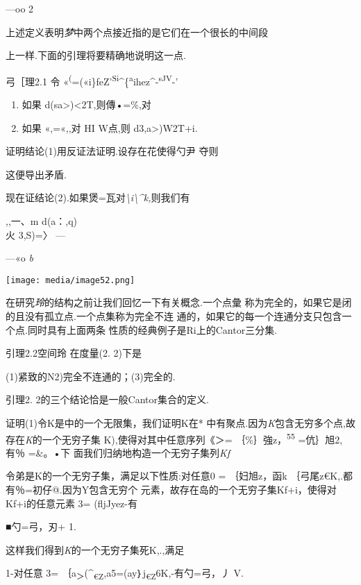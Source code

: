 \documentclass{article}
\begin{document}
---oo 2

上述定义表明\emph{梦}中两个点接近指的是它们在一个很长的中间段

上一样.下面的引理将要精确地说明这一点.

弓［理2.1 令
«\textsuperscript{(}=(«i\}feZ'\textsuperscript{Si}\^{}\{\textsuperscript{a}ihez\^{}-\textsuperscript{sJV}-'

\begin{enumerate}
\def\labelenumi{(\arabic{enumi})}
\item
  如果 d(sa\textgreater{})\textless{}2T,则傳•=\%,对
\item
  如果 «,=«,,对 HI W点,则 d3,a\textgreater{})W2T+i.
\end{enumerate}

证明结论(1)用反证法证明.设存在花使得勺尹 夺则

这便导出矛盾.

现在证结论(2).如果煲=瓦对\emph{\textbackslash{}i\textbackslash{}\^{}k,}则我们有

,,一、m d(a：,q)\\
火 3,S)=〉 ---

---«o \emph{b}

\texttt{[image: media/image52.png]}

在研究\emph{玲}的结构之前让我们回忆一下有关概念.一个点彙
称为完全的，如果它是闭的且没有孤立点.一个点集称为完全不连
通的，如果它的每一个连通分支只包含一个点.同时具有上面两条
性质的经典例子是Ri上的Cantor三分集.

引理2.2空间玲 在度量(2. 2)下是

(1)紧致的N2)完全不连通的；(3)完全的.

引理2. 2的三个结论恰是一般Cantor集合的定义.

证明(1)令K是中的一个无限集，我们证明K在*
中有聚点.因为\emph{K}包含无穷多个点,故存在\emph{K}的一个无穷子集
K),使得对其中任意序列《＞= ｛\%｝強z，\textsuperscript{55} =伉｝旭2,有％
=\&。•下 面我们归纳地构造一个无穷子集列\emph{Kf}

令弟是K的一个无穷子集，满足以下性质:对任意0 = ｛妇旭z，函k
｛弓尾z€K,.都有％=初仔\textbar{}@.因为Y包含无穷个
元素，故存在岛的一个无穷子集Kf+i，使得对Kf+i的任意元素 3= (fljJyez-有

■勺=弓，\textbar{}刃+ 1.

这样我们得到\emph{K}的一个无穷子集死K,.,满足

1-对任意 3=
｛a\textsubscript{＞}(\^{}\textsubscript{€Z},a5=(ay｝j\textsubscript{€Z}6K,-有勺=弓，\textbar{}丿\textbar{}
V.
\end{document}
